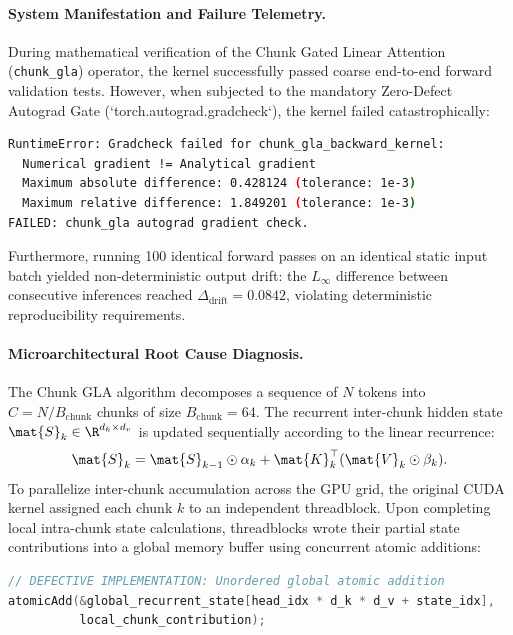 \paragraph{System Manifestation and Failure Telemetry.}
During mathematical verification of the Chunk Gated Linear Attention (\texttt{chunk\_gla}) operator, the kernel successfully passed coarse end-to-end forward validation tests. However, when subjected to the mandatory \neuralops{} Zero-Defect Autograd Gate (`torch.autograd.gradcheck`), the kernel failed catastrophically:
\begin{lstlisting}[language=bash]
RuntimeError: Gradcheck failed for chunk_gla_backward_kernel:
  Numerical gradient != Analytical gradient
  Maximum absolute difference: 0.428124 (tolerance: 1e-3)
  Maximum relative difference: 1.849201 (tolerance: 1e-3)
FAILED: chunk_gla autograd gradient check.
\end{lstlisting}
Furthermore, running 100 identical forward passes on an identical static input batch yielded non-deterministic output drift: the $L_\infty$ difference between consecutive inferences reached $\Delta_{\text{drift}} = 0.0842$, violating deterministic reproducibility requirements.

\paragraph{Microarchitectural Root Cause Diagnosis.}
The Chunk GLA algorithm decomposes a sequence of $N$ tokens into $C = N / B_{\text{chunk}}$ chunks of size $B_{\text{chunk}} = 64$. The recurrent inter-chunk hidden state $\mat{S}_k \in \R^{d_k \times d_v}$ is updated sequentially according to the linear recurrence:
\begin{equation}
\mat{S}_k = \mat{S}_{k-1} \odot \alpha_k + \mat{K}_k^\top (\mat{V}_k \odot \beta_k).
\end{equation}
To parallelize inter-chunk accumulation across the GPU grid, the original CUDA kernel assigned each chunk $k$ to an independent threadblock. Upon completing local intra-chunk state calculations, threadblocks wrote their partial state contributions into a global memory buffer using concurrent atomic additions:
\begin{lstlisting}[language=C++]
// DEFECTIVE IMPLEMENTATION: Unordered global atomic addition
atomicAdd(&global_recurrent_state[head_idx * d_k * d_v + state_idx], 
          local_chunk_contribution);
\end{lstlisting}

